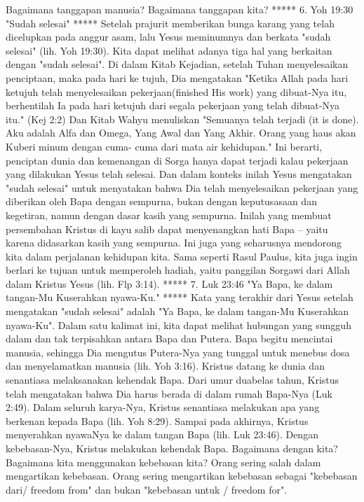 Bagaimana tanggapan manusia? Bagaimana tanggapan kita?
***** 6. Yoh 19:30 "Sudah selesai" *****
Setelah prajurit memberikan bunga karang yang telah dicelupkan pada anggur
asam, lalu Yesus meminumnya dan berkata "sudah selesai" (lih. Yoh 19:30). Kita
dapat melihat adanya tiga hal yang berkaitan dengan "sudah selesai". Di dalam
Kitab Kejadian, setelah Tuhan menyelesaikan penciptaan, maka pada hari ke
tujuh, Dia mengatakan "Ketika Allah pada hari ketujuh telah menyelesaikan
pekerjaan(finished His work) yang dibuat-Nya itu, berhentilah Ia pada hari
ketujuh dari segala pekerjaan yang telah dibuat-Nya itu." (Kej 2:2) Dan Kitab
Wahyu menuliskan "Semuanya telah terjadi (it is done). Aku adalah Alfa dan
Omega, Yang Awal dan Yang Akhir. Orang yang haus akan Kuberi minum dengan cuma-
cuma dari mata air kehidupan." Ini berarti, penciptan dunia dan kemenangan di
Sorga hanya dapat terjadi kalau pekerjaan yang dilakukan Yesus telah selesai.
Dan dalam konteks inilah Yesus mengatakan "sudah selesai" untuk menyatakan
bahwa Dia telah menyelesaikan pekerjaan yang diberikan oleh Bapa dengan
sempurna, bukan dengan keputusasaan dan kegetiran, namun dengan dasar kasih
yang sempurna. Inilah yang membuat persembahan Kristus di kayu salib dapat
menyenangkan hati Bapa – yaitu karena didasarkan kasih yang sempurna.
Ini juga yang seharusnya mendorong kita dalam perjalanan kehidupan kita. Sama
seperti Rasul Paulus, kita juga ingin berlari ke tujuan untuk memperoleh
hadiah, yaitu panggilan Sorgawi dari Allah dalam Kristus Yesus (lih. Flp 3:14).
***** 7. Luk 23:46 "Ya Bapa, ke dalam tangan-Mu Kuserahkan nyawa-Ku." *****
Kata yang terakhir dari Yesus setelah mengatakan "sudah selesai" adalah "Ya
Bapa, ke dalam tangan-Mu Kuserahkan nyawa-Ku". Dalam satu kalimat ini, kita
dapat melihat hubungan yang sungguh dalam dan tak terpisahkan antara Bapa dan
Putera. Bapa begitu mencintai manusia, sehingga Dia mengutus Putera-Nya yang
tunggal untuk menebus dosa dan menyelamatkan manusia (lih. Yoh 3:16). Kristus
datang ke dunia dan senantiasa melaksanakan kehendak Bapa. Dari umur duabelas
tahun, Kristus telah mengatakan bahwa Dia harus berada di dalam rumah Bapa-Nya
(Luk 2:49). Dalam seluruh karya-Nya, Kristus senantiasa melakukan apa yang
berkenan kepada Bapa (lih. Yoh 8:29). Sampai pada akhirnya, Kristus menyerahkan
nyawaNya ke dalam tangan Bapa (lih. Luk 23:46). Dengan kebebasan-Nya, Kristus
melakukan kehendak Bapa.
Bagaimana dengan kita? Bagaimana kita menggunakan kebebasan kita? Orang sering
salah dalam mengartikan kebebasan. Orang sering mengartikan kebebasan sebagai
"kebebasan dari/ freedom from" dan bukan "kebebasan untuk / freedom for".
